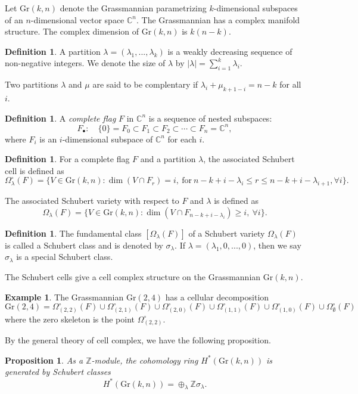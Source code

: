 \documentclass{article}
\newtheorem{proposition}[theorem]{Proposition}
\theoremstyle{definition}
\newtheorem{definition}[theorem]{Definition}
\newtheorem{eg}[theorem]{Example}
\begin{document}
Let \( \text{Gr}(k, n) \) denote the Grassmannian parametrizing \( k \)-dimensional subspaces of an \( n \)-dimensional vector space \( \mathbb{C}^n \). The Grassmannian has a complex manifold structure. The complex dimension of \( \text{Gr}(k, n) \) is \( k(n-k) \).
\begin{definition} A partition $\lambda=(\lambda_1,...,\lambda_k)$ is a weakly decreasing sequence of non-negative integers. We denote the size of $\lambda$ by $|\lambda|=\sum_{i=1}^k\lambda_i$. 

Two partitions $\lambda$ and $\mu$ are said to be complentary if $\lambda_i+\mu_{k+1-i}=n-k$ for all $i$.
\end{definition}
\begin{definition} A \textit{complete flag} \( F \) in \( \mathbb{C}^n \) is a sequence of nested subspaces:
\[
F_\bullet: \quad \{0\} = F_0 \subset F_1 \subset F_2 \subset \cdots \subset F_n = \mathbb{C}^n,
\]
where \( F_i \) is an \( i \)-dimensional subspace of \( \mathbb{C}^n \) for each \( i \). 
\end{definition}
\begin{definition} For a complete flag $F$ and a partition $\lambda$, the associated Schubert cell is defined as 
$$\Omega_\lambda^\circ(F) = \{V \in \text{Gr}(k, n) : \dim(V \cap F_r)=i,\ \mathrm{for}\ n-k+i-\lambda_i\leq r\leq n-k+i-\lambda_{i+1}, \forall i \}.$$

The associated Schubert variety with respect to $F$ and $\lambda$ is defined as
$$\Omega_\lambda(F) = \{V \in \text{Gr}(k, n) : \dim(V \cap F_{n-k+i-\lambda_i})\geq i,\ \forall i \}.$$
\end{definition}
\begin{definition} The fundamental class $[\Omega_\lambda(F) ]$ of a Schubert variety $\Omega_\lambda(F) $ is called a Schubert class and is denoted by $\sigma_\lambda$. If $\lambda=(\lambda_1, 0,...,0)$, then we say $\sigma_\lambda$ is a special Schubert class.
\end{definition}
The Schubert cells give a cell complex structure on the Grassmannian $\text{Gr}(k, n)$. 
\begin{eg} The Grassmannian $\mathrm{Gr}(2, 4)$ has a cellular decomposition
$$\mathrm{Gr}(2, 4)=\Omega_{(2, 2)}^\circ(F)\cup\Omega_{(2, 1)}^\circ(F)\cup\Omega_{(2, 0)}^\circ(F)\cup\Omega_{(1, 1)}^\circ(F)\cup\Omega_{(1, 0)}^\circ(F)\cup\Omega_\emptyset^\circ(F)$$
where the zero skeleton is the point $\Omega^\circ_{(2, 2)}$.
\end{eg}
By the general theory of cell complex, we have the following proposition.
\begin{proposition} As a $\mathbb{Z}$-module, the cohomology ring $H^*(\text{Gr}(k, n))$ is generated by Schubert classes
$$H^*(\text{Gr}(k, n))=\oplus_\lambda\mathbb{Z}\sigma_\lambda.$$
\end{proposition}
\end{document}
